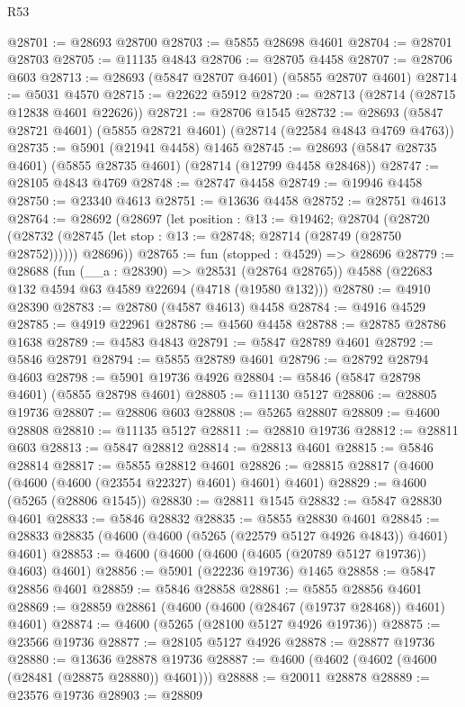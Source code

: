 \begin{lexlean}{R53}
\begin{coremodule}
@28701 := @28693 @28700
@28703 := @5855 @28698 @4601
@28704 := @28701 @28703
@28705 := @11135 @4843
@28706 := @28705 @4458
@28707 := @28706 @603
@28713 := @28693 (@5847 @28707 @4601) (@5855 @28707 @4601)
@28714 := @5031 @4570
@28715 := @22622 @5912
@28720 := @28713 (@28714 (@28715 @12838 @4601 @22626))
@28721 := @28706 @1545
@28732 := @28693 (@5847 @28721 @4601) (@5855 @28721 @4601) (@28714 (@22584 @4843 @4769 @4763))
@28735 := @5901 (@21941 @4458) @1465
@28745 := @28693 (@5847 @28735 @4601) (@5855 @28735 @4601) (@28714 (@12799 @4458 @28468))
@28747 := @28105 @4843 @4769
@28748 := @28747 @4458
@28749 := @19946 @4458
@28750 := @23340 @4613
@28751 := @13636 @4458
@28752 := @28751 @4613
@28764 := @28692
    (@28697
      (let position : @13 := @19462;
      @28704
        (@28720 (@28732 (@28745 (let stop : @13 := @28748; @28714 (@28749 (@28750 @28752))))))
        @28696))
@28765 := fun (stopped : @4529) => @28696
@28779 := @28688
    (fun (__a : @28390) => @28531 (@28764 @28765))
    @4588
    (@22683 @132 @4594 @63 @4589 @22694 (@4718 (@19580 @132)))
@28780 := @4910 @28390
@28783 := @28780 (@4587 @4613) @4458
@28784 := @4916 @4529
@28785 := @4919 @22961
@28786 := @4560 @4458
@28788 := @28785 @28786 @1638
@28789 := @4583 @4843
@28791 := @5847 @28789 @4601
@28792 := @5846 @28791
@28794 := @5855 @28789 @4601
@28796 := @28792 @28794 @4603
@28798 := @5901 @19736 @4926
@28804 := @5846 (@5847 @28798 @4601) (@5855 @28798 @4601)
@28805 := @11130 @5127
@28806 := @28805 @19736
@28807 := @28806 @603
@28808 := @5265 @28807
@28809 := @4600 @28808
@28810 := @11135 @5127
@28811 := @28810 @19736
@28812 := @28811 @603
@28813 := @5847 @28812
@28814 := @28813 @4601
@28815 := @5846 @28814
@28817 := @5855 @28812 @4601
@28826 := @28815 @28817 (@4600 (@4600 (@4600 (@23554 @22327) @4601) @4601) @4601)
@28829 := @4600 (@5265 (@28806 @1545))
@28830 := @28811 @1545
@28832 := @5847 @28830 @4601
@28833 := @5846 @28832
@28835 := @5855 @28830 @4601
@28845 := @28833 @28835 (@4600 (@4600 (@5265 (@22579 @5127 @4926 @4843)) @4601) @4601)
@28853 := @4600 (@4600 (@4600 (@4605 (@20789 @5127 @19736)) @4603) @4601)
@28856 := @5901 (@22236 @19736) @1465
@28858 := @5847 @28856 @4601
@28859 := @5846 @28858
@28861 := @5855 @28856 @4601
@28869 := @28859 @28861 (@4600 (@4600 (@28467 (@19737 @28468)) @4601) @4601)
@28874 := @4600 (@5265 (@28100 @5127 @4926 @19736))
@28875 := @23566 @19736
@28877 := @28105 @5127 @4926
@28878 := @28877 @19736
@28880 := @13636 @28878 @19736
@28887 := @4600 (@4602 (@4602 (@4600 (@28481 (@28875 @28880)) @4601)))
@28888 := @20011 @28878
@28889 := @23576 @19736
@28903 := @28809

\end{coremodule}
\end{lexlean}
